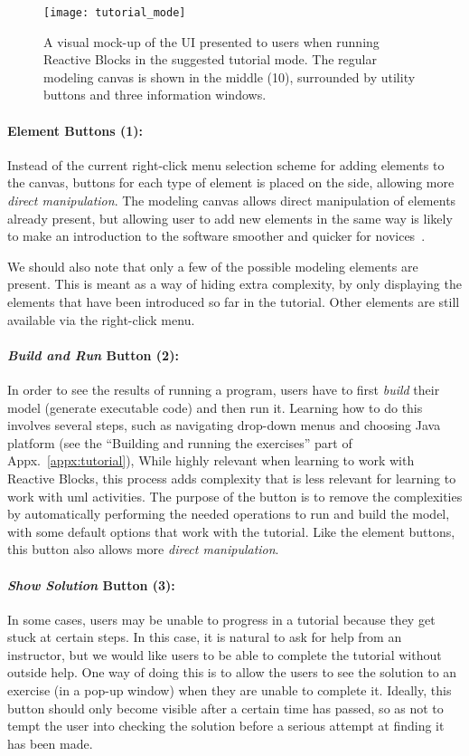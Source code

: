 \begin{figure}[htp]
	\centering
	\texttt{[image: tutorial\_mode]}
	\caption[Reactive Blocks tutorial mode design]{A visual mock-up of the UI presented to users when running Reactive Blocks in the suggested tutorial mode. The regular modeling canvas is shown in the middle (10), surrounded by utility buttons and three information windows.}
	\label{fig:tutorial_mode}
\end{figure}

\paragraph{Element Buttons (1):} Instead of the current right-click menu selection scheme for adding elements to the canvas, buttons for each type of element is placed on the side, allowing more \emph{direct manipulation}. The modeling canvas allows direct manipulation of elements already present, but allowing user to add new elements in the same way is likely to make an introduction to the software smoother and quicker for novices~\cite{shneiderman:user_interface}.

\noindent
We should also note that only a few of the possible modeling elements are present. This is meant as a way of hiding extra complexity, by only displaying the elements that have been introduced so far in the tutorial. Other elements are still available via the right-click menu.

\paragraph{\emph{Build and Run} Button (2):} In order to see the results of running a program, users have to first \emph{build} their model (generate executable code) and then run it. Learning how to do this involves several steps, such as navigating drop-down menus and choosing Java platform (see the ``Building and running the exercises'' part of Appx.~\ref{appx:tutorial}), While highly relevant when learning to work with Reactive Blocks, this process adds complexity that is less relevant for learning to work with \gls{uml} activities. The purpose of the button is to remove the complexities by automatically performing the needed operations to run and build the model, with some default options that work with the tutorial. Like the element buttons, this button also allows more \emph{direct manipulation}.

\paragraph{\emph{Show Solution} Button (3):} In some cases, users may be unable to progress in a tutorial because they get stuck at certain steps. In this case, it is natural to ask for help from an instructor, but we would like users to be able to complete the tutorial without outside help. One way of doing this is to allow the users to see the solution to an exercise (in a pop-up window) when they are unable to complete it. Ideally, this button should only become visible after a certain time has passed, so as not to tempt the user into checking the solution before a serious attempt at finding it has been made.

